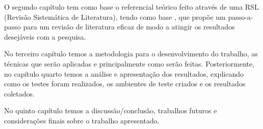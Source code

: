 O segundo capítulo tem como base o referencial teórico feito através de uma RSL (Revisão Sistemática de Literatura), tendo como base \cite{Kitchenham}, que propõe um passo-a-passo para um revisão de literatura eficaz de modo a atingir os resultados desejáveis com a pesquisa.

No terceiro capítulo temos a metodologia para o desenvolvimento do trabalho, as técnicas que serão aplicadas e principalmente como serão feitas. Posteriormente, no capítulo quarto temos a análise e apresentação dos resultados, explicando como os testes foram realizados, os ambientes de teste criados e os resultados coletados.

No quinto capítulo temos a discussão/conclusão, trabalhos futuros e considerações finais sobre o trabalho apresentado.


%
%
%

